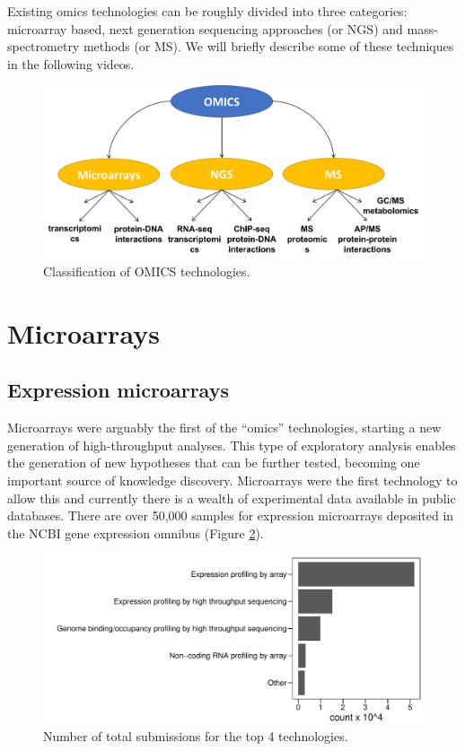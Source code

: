 \documentclass[]{book}
\theoremstyle{definition}
\theoremstyle{definition}
\theoremstyle{definition}
\theoremstyle{remark}
\begin{document}
Existing omics technologies can be roughly divided into three
categories: microarray based, next generation sequencing approaches (or
NGS) and mass-spectrometry methods (or MS). We will briefly describe
some of these techniques in the following videos.

\begin{figure}
\includegraphics[width=20.82in]{pic/omics_3} \caption{Classification of OMICS technologies.}\label{fig:omics-3}
\end{figure}

\section{Microarrays}\label{microarrays}

\subsection{Expression microarrays}\label{expression-microarrays}

Microarrays were arguably the first of the ``omics'' technologies,
starting a new generation of high-throughput analyses. This type of
exploratory analysis enables the generation of new hypotheses that can
be further tested, becoming one important source of knowledge discovery.
Microarrays were the first technology to allow this and currently there
is a wealth of experimental data available in public databases. There
are over 50,000 samples for expression microarrays deposited in the NCBI
gene expression omnibus (Figure \ref{fig:geo}).

\begin{figure}
\centering
\includegraphics{pic/geo_total.pdf}
\caption{\label{fig:geo}Number of total submissions for the top 4
technologies.}
\end{figure}
\end{document}
